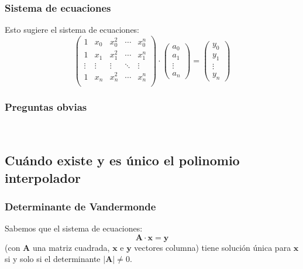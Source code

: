 \documentclass[english, spanish, fleqn,%
hyperref = {colorlinks, urlcolor = blue}%
]{beamer}
\begin{document}
\begin{frame}
  \frametitle{Sistema de ecuaciones}

  Esto sugiere el sistema de ecuaciones:
  \begin{equation*}
    \begin{pmatrix}
      1	     & x_0    & x_0^2  & \cdots & x_0^n	 \\
      1	     & x_1    & x_1^2  & \cdots & x_1^n	 \\
      \vdots & \vdots & \vdots & \ddots & \vdots \\
      1	     & x_n    & x_n^2  & \cdots & x_n^n	 \\
    \end{pmatrix}
      \cdot \begin{pmatrix}
               a_0    \\
               a_1    \\
               \vdots \\
               a_n
            \end{pmatrix}
      =	 \begin{pmatrix}
            y_0	   \\
            y_1	   \\
            \vdots \\
            y_n
          \end{pmatrix}
  \end{equation*}
\end{frame}

\begin{frame}
  \frametitle{Preguntas obvias}


  \\ \bigskip
\end{frame}

\subsection{Cuándo existe y es único el polinomio interpolador}

\begin{frame}
  \frametitle{Determinante de Vandermonde}

  Sabemos que el sistema de ecuaciones:
  \begin{equation*}
    \mathbf{A} \cdot \mathbf{x}
      = \mathbf{y}
  \end{equation*}
  (con \(\mathbf{A}\) una matriz cuadrada,
   \(\mathbf{x}\) e \(\mathbf{y}\) vectores columna)
  tiene solución única para \(\mathbf{x}\) si y solo si
  el determinante \(\lvert \mathbf{A} \rvert \ne 0\).
\end{frame}
\end{document}

